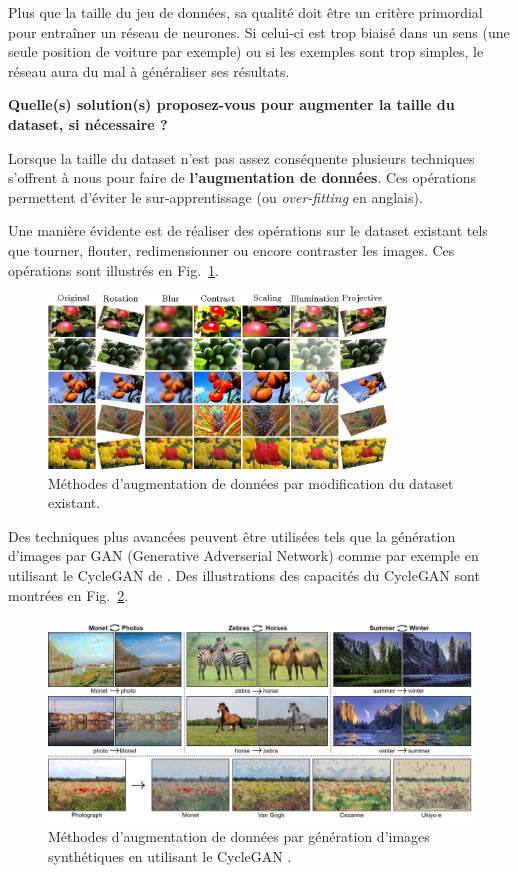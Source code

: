\documentclass[12pt]{article}
\begin{document}
Plus que la taille du jeu de données, sa qualité doit être un critère primordial pour entraîner un réseau de neurones. Si celui-ci est trop biaisé dans un sens (une seule position de voiture par exemple) ou si les exemples sont trop simples, le réseau aura du mal à généraliser ses résultats.

\textbf{Quelle(s) solution(s) proposez-vous pour augmenter la taille du dataset, si nécessaire ?}

Lorsque la taille du dataset n'est pas assez conséquente plusieurs techniques s'offrent à nous pour faire de \textbf{l'augmentation de données}. Ces opérations permettent d'éviter le sur-apprentissage (ou \textit{over-fitting} en anglais).

Une manière évidente est de réaliser des opérations sur le dataset existant tels que tourner, flouter, redimensionner ou encore contraster les images. Ces opérations sont illustrés en Fig.~\ref{fig:data_augmentation}.

\begin{figure}[htbp]
    \centering
    \includegraphics[width=0.8\textwidth]{figures/datasets/dataaugmention_illustration.png}
    \caption{Méthodes d'augmentation de données par modification du dataset existant.}
    \label{fig:data_augmentation}
\end{figure}

Des techniques plus avancées peuvent être utilisées tels que la génération d'images par GAN (Generative Adverserial Network) comme par exemple en utilisant le CycleGAN de \cite{CycleGAN2017}. Des illustrations des capacités du CycleGAN sont montrées en Fig.~\ref{fig:data_augmentation_gan}.

\begin{figure}[htbp]
    \centering
    \includegraphics[width=\textwidth]{figures/datasets/cycle_gan.jpg}
    \caption{Méthodes d'augmentation de données par génération d'images synthétiques en utilisant le CycleGAN \citep{CycleGAN2017}.}
    \label{fig:data_augmentation_gan}
\end{figure}
\end{document}
